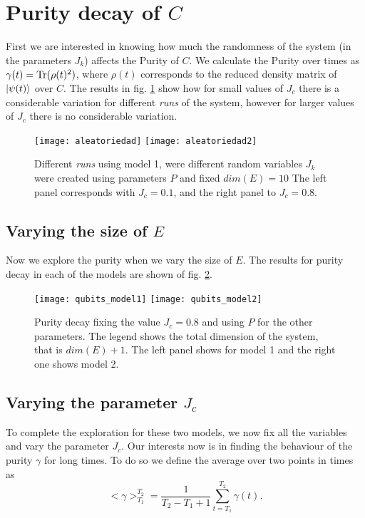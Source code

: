 \documentclass[twocolumn,floatfix]{article}
\begin{document}
\section{Purity decay of $C$}
First we are interested in knowing how much the randomness of the 
system (in the parameters $J_k$) affects the Purity of $C$.
We calculate the Purity over times as $\gamma(t)= {\rm Tr}(\rho (t)^2)$, where $\rho(t)$ corresponds to
the reduced density matrix of $\Ket{\psi(t)}$ over $C$.
The results in fig. \ref{randomness} show how for small values of $J_c$ there is a considerable variation 
for different {\it runs} of the system, however for larger values of $J_c$ there is no considerable 
variation.
\begin{figure}[H]
\begin{center}
\texttt{[image: aleatoriedad]} \hfill
\texttt{[image: aleatoriedad2]} 
\end{center}
\caption{Different {\it runs} using model 1, were different random variables $J_k$ were created using parameters $P$ and fixed $dim(E)=10$
The left panel corresponds with $J_c=0.1$, and the right panel to $J_c=0.8$.  }
\label{randomness}
\end{figure}


\subsection{Varying the size of $E$}
Now we explore the purity when we vary the size of $E$. The results for purity decay in
each of the models are shown of fig. \ref{varE}.
\begin{figure}[H]
\begin{center}
\texttt{[image: qubits\_model1]} \hfill
\texttt{[image: qubits\_model2]} 
\end{center}
\caption{Purity decay fixing the value $J_c=0.8$ and using $P$ for the other parameters.
The legend shows the total dimension of the system, that is $dim(E)+1$.
The left panel
shows for model 1 and the right one shows model 2.}
\label{varE}
\end{figure}

\subsection{Varying the parameter $J_c$}
To complete the exploration for these two models, we now fix all the variables and
vary the parameter $J_c$. Our interests now is in finding the behaviour of the purity $\gamma$
for long times. To do so we define the average over two points in times as
\begin{equation}
<\gamma>_{T_1}^{T_2} = \frac{1}{T_2-T_1+1} \sum_{t=T_1}^{T_2} \gamma(t).
\end{equation}
\end{document}
